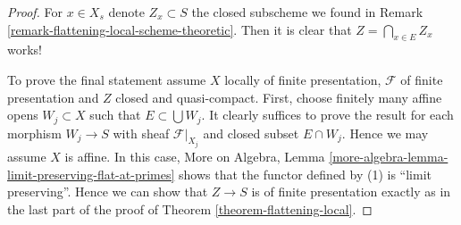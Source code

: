 \documentclass[10pt,a4paper]{amsart}
\theoremstyle{plain}
\theoremstyle{definition}
\theoremstyle{remark}
\numberwithin{equation}{subsection}
\begin{document}
\begin{proof}
For $x \in X_s$ denote $Z_x \subset S$ the closed subscheme we found in
Remark \ref{remark-flattening-local-scheme-theoretic}.
Then it is clear that $Z = \bigcap_{x \in E} Z_x$ works!

\medskip\noindent
To prove the final statement assume $X$ locally of finite presentation,
$\mathcal{F}$ of finite presentation and $Z$ closed and quasi-compact.
First, choose finitely many affine opens $W_j \subset X$ such that
$E \subset \bigcup W_j$. It clearly suffices to prove the
result for each morphism $W_j \to S$ with sheaf $\mathcal{F}|_{X_j}$
and closed subset $E \cap W_j$. Hence we may assume $X$ is affine.
In this case,
More on Algebra, Lemma \ref{more-algebra-lemma-limit-preserving-flat-at-primes}
shows that the functor defined by (1) is ``limit preserving''.
Hence we can show that $Z \to S$ is of finite presentation exactly
as in the last part of the proof of
Theorem \ref{theorem-flattening-local}.
\end{proof}
\end{document}
